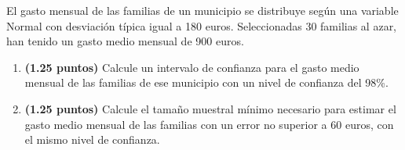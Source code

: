
El gasto mensual de las familias de un municipio se distribuye según una variable Normal con desviación típica igual a 180 euros. Seleccionadas 30 familias al azar, han tenido un gasto medio mensual de 900 euros.
\begin{enumerate}[label=\alph*)]
\item \textbf{(1.25 puntos)} Calcule un intervalo de confianza para el gasto medio mensual de las familias de ese municipio con un nivel de confianza del 98\%.
\item \textbf{(1.25 puntos)} Calcule el tamaño muestral mínimo necesario para estimar el gasto medio mensual de las familias con un error no superior a 60 euros, con el mismo nivel de confianza.
\end{enumerate}
